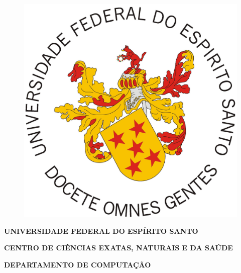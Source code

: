 \documentclass[
	12pt,				%
	openright,			%
	oneside,			%
	a4paper,			%
	english,			%
	french,				%
	spanish,			%
	brazil				%
	]{abntex2}
\begin{document}
\begin{figure}
\centering
\includegraphics[width=.20\textwidth]{figuras/brasao.jpg} 
\label{fig-brasao}
\end{figure}

\begin{center}
\textbf{\textsf{UNIVERSIDADE FEDERAL DO ESPÍRITO SANTO}}

\textbf{\textsf{CENTRO DE CIÊNCIAS EXATAS, NATURAIS E DA SAÚDE}}

\textbf{\textsf{DEPARTAMENTO DE COMPUTAÇÃO}}

\large{\textbf{\textsf{  }}}

\large{\textbf{\textsf{  }}}
\end{center}

\frenchspacing

\imprimircapa

\imprimirfolhaderosto*



%     

	
	
	
	
\end{document}
